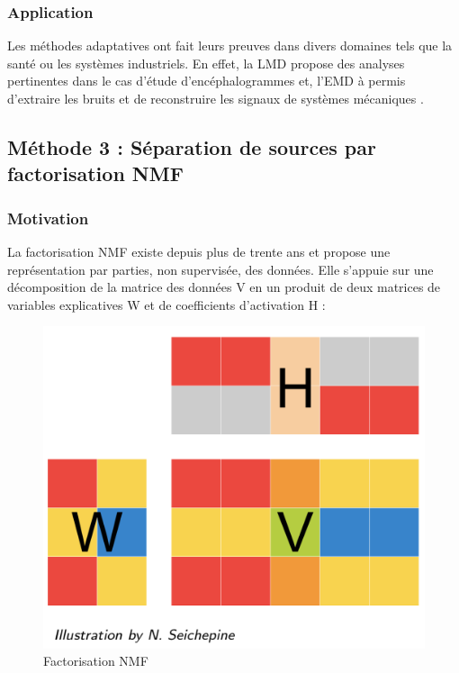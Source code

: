 \subsubsection{Application}
Les méthodes adaptatives ont fait leurs preuves dans divers domaines tels que la santé ou les systèmes industriels. En effet, la LMD propose des analyses pertinentes dans le cas d'étude d'encéphalogrammes \cite{test_LMD} et, l'EMD à permis d'extraire les bruits et de reconstruire les signaux de systèmes mécaniques \cite{MFD}.

\subsection{Méthode 3 : Séparation de sources par factorisation NMF}
\subsubsection{Motivation}
La factorisation NMF existe depuis plus de trente ans et propose une représentation par parties, non supervisée, des données. Elle s'appuie sur une décomposition de la matrice des données V en un produit de deux matrices de variables explicatives W et de coefficients d'activation H :

\begin{figure}[!ht]
\begin{center}
\includegraphics[scale=0.4]{rapport/images/Ch3_NMF1.png}
\end{center}
\caption{Factorisation NMF}
\end{figure}

